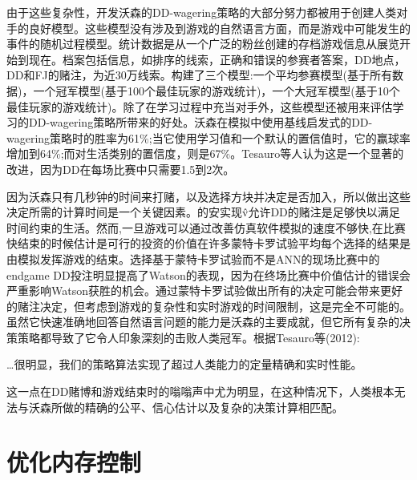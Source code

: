 由于这些复杂性，开发沃森的DD-wagering策略的大部分努力都被用于创建人类对手的良好模型。这些模型没有涉及到游戏的自然语言方面，而是游戏中可能发生的事件的随机过程模型。统计数据是从一个广泛的粉丝创建的存档游戏信息从展览开始到现在。档案包括信息，如排序的线索，正确和错误的参赛者答案，DD地点，DD和FJ的赌注，为近30万线索。构建了三个模型:一个平均参赛模型(基于所有数据)，一个冠军模型(基于100个最佳玩家的游戏统计)，一个大冠军模型(基于10个最佳玩家的游戏统计)。除了在学习过程中充当对手外，这些模型还被用来评估学习的DD-wagering策略所带来的好处。沃森在模拟中使用基线启发式的DD-wagering策略时的胜率为61\%;当它使用学习值和一个默认的置信值时，它的赢球率增加到64\%;而对生活类别的置信度，则是67\%。Tesauro等人认为这是一个显著的改进，因为DD在每场比赛中只需要1.5到2次。

因为沃森只有几秒钟的时间来打赌，以及选择方块并决定是否加入，所以做出这些决定所需的计算时间是一个关键因素。的安实现v̂允许DD的赌注是足够快以满足时间约束的生活。然而,一旦游戏可以通过改善仿真软件模拟的速度不够快,在比赛快结束的时候估计是可行的投资的价值在许多蒙特卡罗试验平均每个选择的结果是由模拟发挥游戏的结束。选择基于蒙特卡罗试验而不是ANN的现场比赛中的endgame DD投注明显提高了Watson的表现，因为在终场比赛中价值估计的错误会严重影响Watson获胜的机会。通过蒙特卡罗试验做出所有的决定可能会带来更好的赌注决定，但考虑到游戏的复杂性和实时游戏的时间限制，这是完全不可能的。
虽然它快速准确地回答自然语言问题的能力是沃森的主要成就，但它所有复杂的决策策略都导致了它令人印象深刻的击败人类冠军。根据Tesauro等(2012):

…很明显，我们的策略算法实现了超过人类能力的定量精确和实时性能。

这一点在DD赌博和游戏结束时的嗡嗡声中尤为明显，在这种情况下，人类根本无法与沃森所做的精确的公平、信心估计以及复杂的决策计算相匹配。



\section{优化内存控制}

